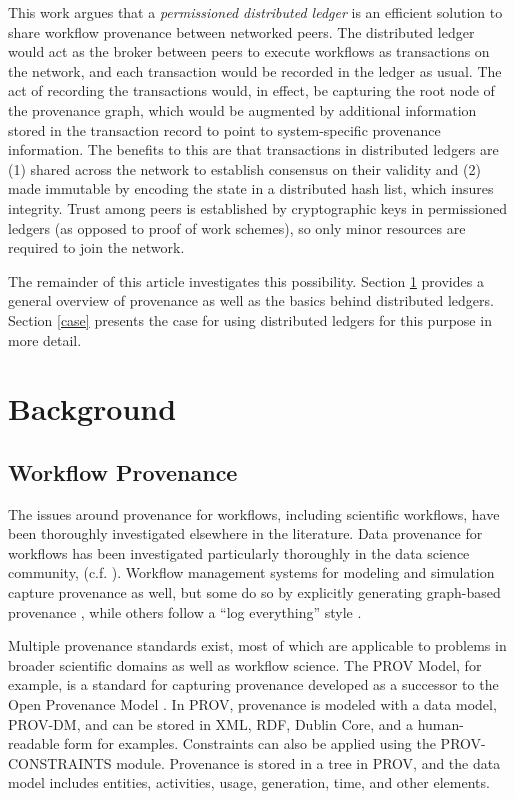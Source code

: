 This work argues that a \textit{permissioned distributed ledger} is an efficient solution to share workflow provenance between networked peers. The distributed ledger would act as the broker between peers to execute workflows as transactions on the network, and each transaction would be recorded in the ledger as usual. The act of recording the transactions would, in effect, be capturing the root node of the provenance graph, which would be augmented by additional information stored in the transaction record to point to system-specific provenance information. The benefits to this are that transactions in distributed ledgers are (1) shared across the network to establish consensus on their validity and (2) made immutable by encoding the state in a distributed hash list, which insures integrity. Trust among peers is established by cryptographic keys in permissioned ledgers (as opposed to proof of work schemes), so only minor resources are required to join the network. 

The remainder of this article investigates this possibility. Section \ref{background} provides a general overview of provenance as well as the basics behind distributed ledgers. Section \ref{case} presents the case for using distributed ledgers for this purpose in more detail.

\section{Background}
\label{background}

\subsection{Workflow Provenance}
The issues around provenance for workflows, including scientific workflows, have been thoroughly investigated elsewhere in the literature. Data provenance for workflows has been investigated particularly thoroughly in the data science community, (c.f. \cite{davidson_provenance_2007}). Workflow management systems for modeling and simulation capture provenance as well, but some do so by explicitly generating graph-based provenance \cite{pizzi_aiida:_2016}, while others follow a ``log everything'' style \cite{billings_eclipse_2017}. 

Multiple provenance standards exist, most of which are applicable to problems in broader scientific domains as well as workflow science. The PROV Model, for example, is a standard for capturing provenance developed as a successor to the Open Provenance Model \cite{noauthor_prov-overview_nodate} \cite{moreau_open_2011}. In PROV, provenance is modeled with a data model, PROV-DM, and can be stored in XML, RDF, Dublin Core, and a human-readable form for examples. Constraints can also be applied using the PROV-CONSTRAINTS module. Provenance is stored in a tree in PROV, and the data model includes entities, activities, usage, generation, time, and other elements. 

